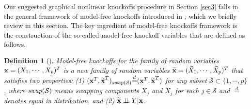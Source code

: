 \documentclass[11pt]{article}
\newtheorem{definition}{Definition}%
\newcommand{\bx}{\mbox{\bf x}}
\newcommand\independent{\protect\mathpalette{\protect\independenT}{\perp}}
\def\independenT#1#2{\mathrel{\setbox0\hbox{$#1#2$}%
\copy0\kern-\wd0\mkern4mu\box0}}
\begin{document}
Our suggested graphical nonlinear knockoffs procedure in Section \ref{sec3} falls in the general framework of model-free knockoffs introduced in \cite{CandesFanJansonLv2016}, which we briefly review in this section. The key ingredient of model-free knockoffs framework is the construction of the so-called model-free knockoff variables that are defined as follows.

\begin{definition}[\cite{CandesFanJansonLv2016}] \label{def1}
Model-free knockoffs for the family of random variables $\bx = (X_1,\cdots, X_p)^T$ is a new family of random variables $\widetilde{\bx} = (\widetilde{X}_1, \cdots, \widetilde{X}_p)^T$ that satisfies two properties: (1) $(\bx^T, \widetilde{\bx}^T)_{\emph{swap}(\mathcal{S})} {\overset{d}{=}}(\bx^T, \widetilde{\bx}^T)$ for any subset $\mathcal{S} \subset\{1,\cdots, p\}$,
	where $\emph{swap}(\mathcal{S})$ means swapping components $X_j$ and $\widetilde{X}_j$ for each $j\in \mathcal{S}$ and $\overset{d}{=}$ denotes equal in distribution, and (2) $\widetilde{\bx} \independent Y | \bx$.
\end{definition}
\end{document}
